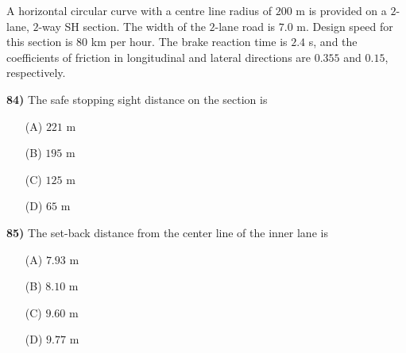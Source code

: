\documentclass[journal]{IEEEtran}
\begin{document}
\begin{enumerate}
A horizontal circular curve with a centre line radius of $200$ m is provided on a $2$-lane, $2$-way SH section. The width of the $2$-lane road is $7.0$ m. Design speed for this section is $80$ km per hour. The brake reaction time is $2.4$ s, and the coefficients of friction in longitudinal and lateral directions are $0.355$ and $0.15$, respectively.
\vspace{0.1cm}

\textbf{84)} The safe stopping sight distance on the section is \textbf{}
\begin{itemize}
    \item[(A)] $221$ m
    \item[(B)] $195$ m
    \item[(C)] $125$ m
    \item[(D)] $65$ m
\end{itemize}

\textbf{85)} The set-back distance from the center line of the inner lane is \textbf{}
\begin{itemize}
    \item[(A)] $7.93$ m
    \item[(B)] $8.10$ m
    \item[(C)] $9.60$ m
    \item[(D)] $9.77$ m
\end{itemize}


\end{enumerate}
\end{document}
